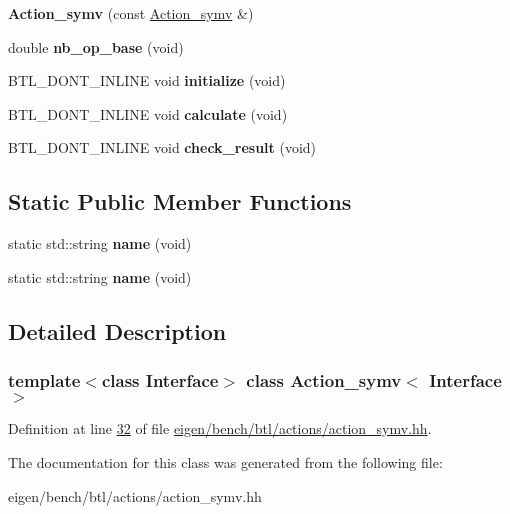 \begin{DoxyCompactItemize}
{\bfseries Action\+\_\+symv} (const \hyperlink{class_action__symv}{Action\+\_\+symv} \&)
\item 
\mbox{\label{class_action__symv_a1338fbe1a2fcadf9df795709a19faf86}} 
double {\bfseries nb\+\_\+op\+\_\+base} (void)
\item 
\mbox{\label{class_action__symv_ad61375d8750436da5122c48559cd369c}} 
B\+T\+L\+\_\+\+D\+O\+N\+T\+\_\+\+I\+N\+L\+I\+NE void {\bfseries initialize} (void)
\item 
\mbox{\label{class_action__symv_a1125303ff8722640da4b2487891b28e9}} 
B\+T\+L\+\_\+\+D\+O\+N\+T\+\_\+\+I\+N\+L\+I\+NE void {\bfseries calculate} (void)
\item 
\mbox{\label{class_action__symv_a3859829cfce5b52f7fd1e7bb4085bb98}} 
B\+T\+L\+\_\+\+D\+O\+N\+T\+\_\+\+I\+N\+L\+I\+NE void {\bfseries check\+\_\+result} (void)
\end{DoxyCompactItemize}
\subsection*{Static Public Member Functions}
\begin{DoxyCompactItemize}
\item 
\mbox{\label{class_action__symv_a3fd0c7842abc1f54bcc5d9b03358f011}} 
static std\+::string {\bfseries name} (void)
\item 
\mbox{\label{class_action__symv_a3fd0c7842abc1f54bcc5d9b03358f011}} 
static std\+::string {\bfseries name} (void)
\end{DoxyCompactItemize}


\subsection{Detailed Description}
\subsubsection*{template$<$class Interface$>$\newline
class Action\+\_\+symv$<$ Interface $>$}



Definition at line \hyperlink{eigen_2bench_2btl_2actions_2action__symv_8hh_source_l00032}{32} of file \hyperlink{eigen_2bench_2btl_2actions_2action__symv_8hh_source}{eigen/bench/btl/actions/action\+\_\+symv.\+hh}.



The documentation for this class was generated from the following file\+:\begin{DoxyCompactItemize}
\item 
eigen/bench/btl/actions/action\+\_\+symv.\+hh\end{DoxyCompactItemize}
